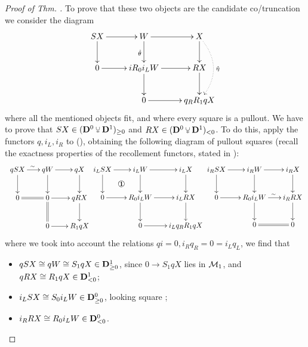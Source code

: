 \begin{proof}[Proof of Thm. \protect{\ref{gluing}}]
To prove that these two objects are the candidate co\fshyp{}truncation we consider the diagram
\[\label{star}
\xymatrix{
  SX	& W	& X \\
  0	& i R_0 i_L W	& RX \\
  	& 0	& q_R R_1 qX
  \ar "1,1";"1,2" 
  \ar "1,1";"2,1" 
  \ar "1,2";"1,3" 
  \ar "1,2";"2,2" _{\hat\theta}
  \ar@{.>}@/^1.4pc/ "1,3";"3,3" ^{\hat\eta}
  \ar "1,3";"2,3" 
  \ar "2,1";"2,2" 
  \ar "2,2";"2,3" 
  \ar "2,2";"3,2" 
  \ar "2,3";"3,3" 
  \ar "3,2";"3,3" 
}\]
where all the mentioned objects fit, and where every square is a pullout. We have to prove that $SX\in (\D^0\glue \D^1)_{\ge 0}$ and $RX\in (\D^0\glue \D^1)_{<0}$. To do this, apply the functors $q, i_L, i_R$ to (), obtaining the following diagram of pullout squares (recall the exactness properties of the recollement functors, stated in \aprop {}):
\[
\scalebox{.9}{
\xymatrix@C=6mm{
  qSX	& qW	& qX \\
  0	& 0	& q RX \\
  	& 0	& R_1 qX
  \ar^\sim "1,1";"1,2" 
  \ar "1,1";"2,1" 
  \ar "1,2";"1,3" 
  \ar "1,2";"2,2" 
  \ar "1,3";"2,3" 
  \ar@{=} "2,1";"2,2" 
  \ar "2,2";"2,3" 
  \ar@{=} "2,2";"3,2" 
  \ar "2,3";"3,3" 
  \ar "3,2";"3,3" 
}
\xymatrix@C=6mm{
  i_L SX	& i_L W	& i_L X \\
  0	& R_0 i_L W	& i_L RX \\
  	& 0	& i_L q_R R_1 qX
  \ar@{} "1,1";"2,2" |{\text{\large \uno}}
  \ar "1,1";"1,2" 
  \ar "1,1";"2,1" 
  \ar "1,2";"1,3" 
  \ar "1,2";"2,2" 
  \ar "1,3";"2,3" 
  \ar "2,1";"2,2" 
  \ar "2,2";"2,3" 
  \ar "2,2";"3,2" 
  \ar "2,3";"3,3" 
  \ar "3,2";"3,3" 
}
\xymatrix@C=6mm{
  i_R SX	& i_R W	& i_R X \\
  0	& R_0 i_L W	& i_R RX \\
  	& 0	& 0
  \ar "1,1";"1,2" 
  \ar "1,1";"2,1" 
  \ar "1,2";"1,3" 
  \ar "1,2";"2,2" 
  \ar "1,3";"2,3" 
  \ar "2,1";"2,2" 
  \ar^\sim "2,2";"2,3" 
  \ar "2,2";"3,2" 
  \ar "2,3";"3,3" 
  \ar@{=} "3,2";"3,3" 
}}\notag
\]
where we took into account the relations $qi=0, i_Rq_R = 0 = i_L q_L$, we find that
\begin{itemize}
\item $qSX\cong qW\cong S_1 qX\in \mathbf{D}_{\ge 0}^1$, since $0\to S_1 qX$ lies in $\mathcal{M}_1$, and $qRX\cong R_1 qX\in\mathbf{D}_{<0}^1$;
\item $i_L SX\cong S_0 i_L W \in \mathbf{D}_{\ge 0}^0$, looking square \text{\uno};
\item $i_R RX\cong R_0 i_L W \in \mathbf{D}_{<0}^0$.
\end{itemize}

\end{proof}
